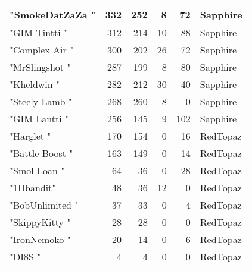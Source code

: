 \documentclass{article}
\begin{document}
\begin{table}[htbp]
\begin{tabular}{|l|r|r|r|r|l|}
"SmokeDatZaZa " & 332 & 252 & 8 & 72 & Sapphire \\ \hline
"GIM Tintti " & 312 & 214 & 10 & 88 & Sapphire \\ \hline
"Complex Air " & 300 & 202 & 26 & 72 & Sapphire \\ \hline
"MrSlingshot " & 287 & 199 & 8 & 80 & Sapphire \\ \hline
"Kheldwin " & 282 & 212 & 30 & 40 & Sapphire \\ \hline
"Steely Lamb " & 268 & 260 & 8 & 0 & Sapphire \\ \hline
"GIM Lantti " & 256 & 145 & 9 & 102 & Sapphire \\ \hline
"Harglet " & 170 & 154 & 0 & 16 & RedTopaz \\ \hline
"Battle Boost " & 163 & 149 & 0 & 14 & RedTopaz \\ \hline
"Smol Loan " & 64 & 36 & 0 & 28 & RedTopaz \\ \hline
"1Hbandit" & 48 & 36 & 12 & 0 & RedTopaz \\ \hline
"BobUnlimited " & 37 & 33 & 0 & 4 & RedTopaz \\ \hline
"SkippyKitty " & 28 & 28 & 0 & 0 & RedTopaz \\ \hline
"IronNemoko " & 20 & 14 & 0 & 6 & RedTopaz \\ \hline
"DI8S " & 4 & 4 & 0 & 0 & RedTopaz \\ \hline
\end{tabular}
\end{table}
\end{document}
